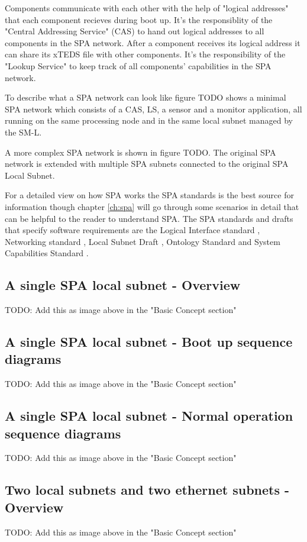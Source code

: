 Components communicate with each other with the help of "logical addresses"
that each component recieves during boot up. It's the responsiblity of the
"Central Addressing Service" (CAS) to hand out logical addresses to all
components in the SPA network. After a component receives its logical address
it can share its xTEDS file with other components. It's the responsibility of
the "Lookup Service" to keep track of all components' capabilities in the SPA
network.

To describe what a SPA network can look like figure TODO shows a minimal SPA
network which consists of a CAS, LS, a sensor and a monitor application, all
running on the same processing node and in the same local subnet managed by the
SM-L.

A more complex SPA network is shown in figure TODO. The original SPA network is
extended with multiple SPA subnets connected to the original SPA Local Subnet.

For a detailed view on how SPA works the SPA standards is the best source for
information though chapter \ref{ch:spa} will go through some scenarios in
detail that can be helpful to the reader to understand SPA. The SPA standards
and drafts that specify software requirements are the Logical Interface
standard \cite{spa:logical-interface}, Networking standard
\cite{spa:networking}, Local Subnet Draft \cite{spa:local-subnet}, Ontology
Standard \cite{spa:ontology} and System Capabilities Standard
\cite{spa:system-capabilities}.

\subsection{A single SPA local subnet - Overview}
TODO: Add this as image above in the "Basic Concept section"

\subsection{A single SPA local subnet - Boot up sequence diagrams}
TODO: Add this as image above in the "Basic Concept section"

\subsection{A single SPA local subnet - Normal operation sequence diagrams}
TODO: Add this as image above in the "Basic Concept section"

\subsection{Two local subnets and two ethernet subnets - Overview}
TODO: Add this as image above in the "Basic Concept section"

